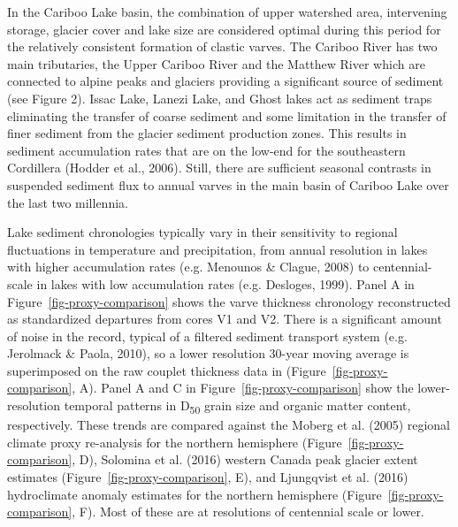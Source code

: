 \documentclass[
  letterpaper,
  DIV=11,
  numbers=noendperiod]{scrartcl}
\begin{document}
In the Cariboo Lake basin, the combination of upper watershed area,
intervening storage, glacier cover and lake size are considered optimal
during this period for the relatively consistent formation of clastic
varves. The Cariboo River has two main tributaries, the Upper Cariboo
River and the Matthew River which are connected to alpine peaks and
glaciers providing a significant source of sediment (see Figure 2).
Issac Lake, Lanezi Lake, and Ghost lakes act as sediment traps
eliminating the transfer of coarse sediment and some limitation in the
transfer of finer sediment from the glacier sediment production zones.
This results in sediment accumulation rates that are on the low-end for
the southeastern Cordillera (Hodder et al., 2006). Still, there are
sufficient seasonal contrasts in suspended sediment flux to annual
varves in the main basin of Cariboo Lake over the last two millennia.

Lake sediment chronologies typically vary in their sensitivity to
regional fluctuations in temperature and precipitation, from annual
resolution in lakes with higher accumulation rates (e.g. Menounos \&
Clague, 2008) to centennial-scale in lakes with low accumulation rates
(e.g. Desloges, 1999). Panel A in Figure~\ref{fig-proxy-comparison}
shows the varve thickness chronology reconstructed as standardized
departures from cores V1 and V2. There is a significant amount of noise
in the record, typical of a filtered sediment transport system (e.g.
Jerolmack \& Paola, 2010), so a lower resolution 30-year moving average
is superimposed on the raw couplet thickness data in
(Figure~\ref{fig-proxy-comparison}, A). Panel A and C in
Figure~\ref{fig-proxy-comparison} show the lower-resolution temporal
patterns in D\textsubscript{50} grain size and organic matter content,
respectively. These trends are compared against the Moberg et al. (2005)
regional climate proxy re-analysis for the northern hemisphere
(Figure~\ref{fig-proxy-comparison}, D), Solomina et al. (2016) western
Canada peak glacier extent estimates (Figure~\ref{fig-proxy-comparison},
E), and Ljungqvist et al. (2016) hydroclimate anomaly estimates for the
northern hemisphere (Figure~\ref{fig-proxy-comparison}, F). Most of
these are at resolutions of centennial scale or lower.
\end{document}
